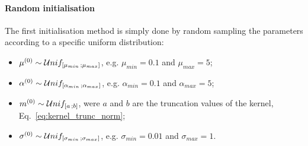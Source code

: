 \paragraph{Random initialisation}
The first initialisation method is simply done by random sampling the parameters according to a specific uniform distribution:
\begin{itemize}
    \item $\mu^{(0)} \sim \mathcal{U}nif_{\left[ \mu_{min} \, ; \mu_{max} \right]}$, e.g. $\mu_{min} = 0.1$ and $\mu_{max} = 5$;
    
    \item $\alpha^{(0)} \sim \mathcal{U}nif_{\left[ \alpha_{min} \, ; \alpha_{max} \right]}$, e.g. $\alpha_{min} = 0.1$ and $\alpha_{max} = 5$;
    
    \item $m^{(0)} \sim \mathcal{U}nif_{\left[ a \, ; b \right]}$, were $a$ and $b$ are the truncation values of the kernel, Eq.~\eqref{eq:kernel_trunc_norm};
    
    \item $\sigma^{(0)} \sim \mathcal{U}nif_{\left[ \sigma_{min} \, ; \sigma_{max} \right]}$, e.g. $\sigma_{min} = 0.01$ and $\sigma_{max} = 1$.
\end{itemize}

